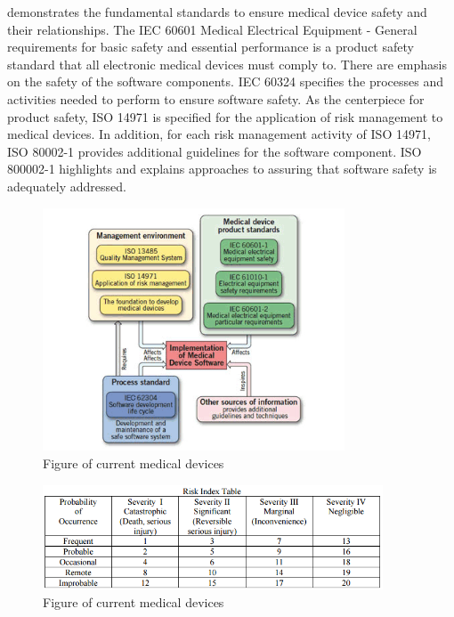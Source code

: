  demonstrates the fundamental standards to ensure medical device safety and their relationships. The IEC 60601 Medical Electrical Equipment - General requirements for basic safety and essential performance is a product safety standard that all electronic medical devices must comply to. There are emphasis on the safety of the software components. IEC 60324 specifies the processes and activities needed to perform to ensure software safety. As the centerpiece for product safety, ISO 14971 is specified for the application of risk management to medical devices. In addition, for each risk management activity of ISO 14971, ISO 80002-1 provides additional guidelines for the software component. ISO 800002-1 highlights and explains approaches to assuring that software safety is adequately addressed.
\begin{figure}[t]
		\centering
		\includegraphics[width=0.8\textwidth]{figs/standards.jpg}
		\caption{\small Figure of current medical devices}
		\label{fig:standards}
\end{figure}



\begin{figure}[t]
		\centering
		\includegraphics[width=0.9\textwidth]{figs/risk.jpg}
		\caption{\small Figure of current medical devices}
		\label{fig:risks}
\end{figure}


